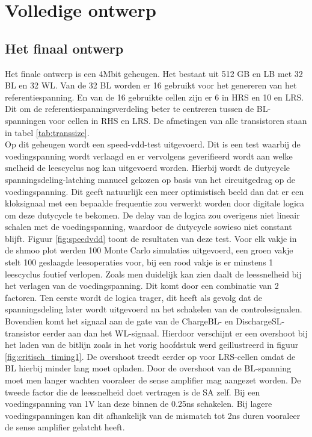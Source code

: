\chapter{Volledige ontwerp}
\label{final}
\section{Het finaal ontwerp}
Het finale ontwerp is een 4Mbit geheugen. Het bestaat uit 512 GB en LB met 32 BL en 32 WL. Van de 32 BL worden er 16 gebruikt voor het genereren van het referentiespanning. En van de 16 gebruikte cellen zijn er 6 in HRS en 10 en LRS. Dit om de referentiespanningsverdeling beter te centreren tussen de BL-spanningen voor cellen in RHS en LRS. De afmetingen van alle transistoren staan in tabel \ref{tab:transsize}. \\
Op dit geheugen wordt een speed-vdd-test uitgevoerd. Dit is een test waarbij de voedingspanning wordt verlaagd en er vervolgens geverifieerd wordt aan welke snelheid de leescyclus nog kan uitgevoerd worden. Hierbij wordt de dutycycle spanningsdeling-latching manueel gekozen op basis van het circuitgedrag op de voedingspanning. Dit geeft natuurlijk een meer optimistisch beeld dan dat er een kloksignaal met een bepaalde frequentie zou verwerkt worden door digitale logica om deze dutycycle te bekomen. De delay van de logica zou overigens niet lineair schalen met de voedingspanning, waardoor de dutycycle sowieso niet constant blijft. Figuur \ref{fig:speedvdd} toont de resultaten van deze test. Voor elk vakje in de shmoo plot werden 100 Monte Carlo simulaties uitgevoerd, een groen vakje stelt 100 geslaagde leesoperaties voor, bij een rood vakje is er minstens 1 leescyclus foutief verlopen. Zoals men duidelijk kan zien  daalt de leessnelheid bij het verlagen van de voedingspanning. Dit komt door een combinatie van 2 factoren. Ten eerste wordt de logica trager, dit heeft als gevolg dat de spanningsdeling later wordt uitgevoerd na het schakelen van de controlesignalen. Bovendien komt het signaal aan de gate van de ChargeBL- en DischargeSL-transistor eerder aan dan het WL-signaal. Hierdoor verschijnt er een overshoot bij het laden van de bitlijn zoals in het vorig hoofdstuk werd geillustreerd in figuur \ref{fig:critisch_timing1}. De overshoot treedt eerder op voor LRS-cellen omdat de BL hierbij minder lang moet opladen. Door de overshoot van de BL-spanning moet men langer wachten vooraleer de sense amplifier mag aangezet worden. De tweede factor die de leessnelheid doet vertragen is de SA zelf. Bij een voedingspanning van 1V kan deze binnen de 0.25ns schakelen. Bij lagere voedingspanningen kan dit afhankelijk van de mismatch tot 2ns duren vooraleer de sense amplifier gelatcht heeft.

